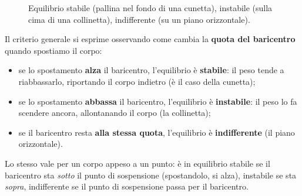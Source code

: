 \begin{figure}[h!]
\centering
{}
\caption{Equilibrio stabile (pallina nel fondo di una cunetta), instabile (sulla cima di una collinetta), indifferente (su un piano orizzontale).}
\label{fig:stab}
\end{figure}

Il criterio generale si esprime osservando come cambia la \textbf{quota del baricentro} quando spostiamo il corpo:
\begin{itemize}
\item se lo spostamento \textbf{alza} il baricentro, l'equilibrio è \textbf{stabile}: il peso tende a riabbassarlo, riportando il corpo indietro (è il caso della cunetta);
\item se lo spostamento \textbf{abbassa} il baricentro, l'equilibrio è \textbf{instabile}: il peso lo fa scendere ancora, allontanando il corpo (la collinetta);
\item se il baricentro resta \textbf{alla stessa quota}, l'equilibrio è \textbf{indifferente} (il piano orizzontale).
\end{itemize}
Lo stesso vale per un corpo appeso a un punto: è in equilibrio stabile se il baricentro sta \emph{sotto} il punto di sospensione (spostandolo, si alza), instabile se sta \emph{sopra}, indifferente se il punto di sospensione passa per il baricentro.

